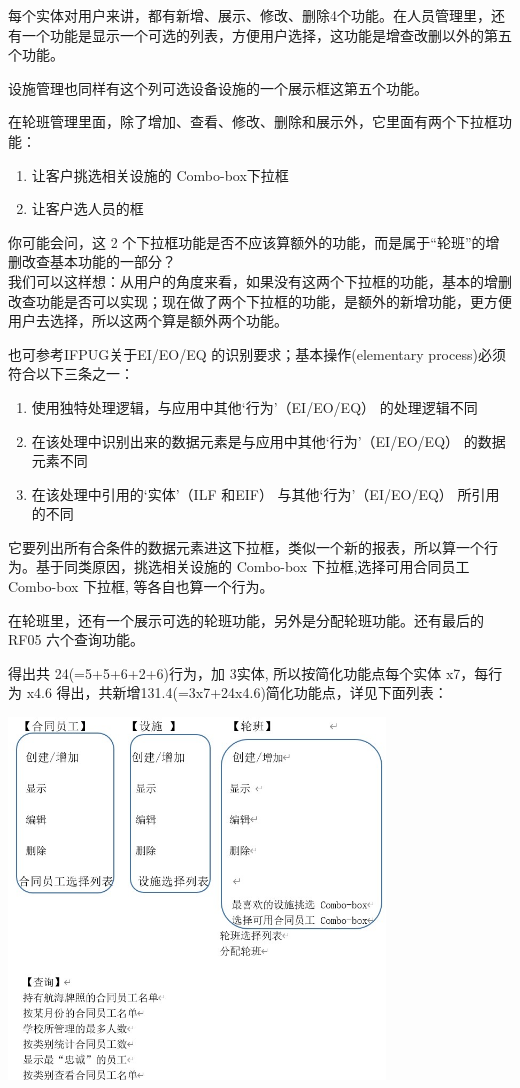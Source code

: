 每个实体对用户来讲，都有新增、展示、修改、删除4个功能。在人员管理里，还有一个功能是显示一个可选的列表，方便用户选择，这功能是增查改删以外的第五个功能。

设施管理也同样有这个列可选设备设施的一个展示框这第五个功能。

在轮班管理里面，除了增加、查看、修改、删除和展示外，它里面有两个下拉框功能：

\begin{enumerate}
\tightlist
\item
  让客户挑选相关设施的 Combo-box下拉框
\item
  让客户选人员的框
\end{enumerate}

你可能会问，这 2
个下拉框功能是否不应该算额外的功能，而是属于``轮班''的增删改查基本功能的一部分？\\
我们可以这样想：从用户的角度来看，如果没有这两个下拉框的功能，基本的增删改查功能是否可以实现；现在做了两个下拉框的功能，是额外的新增功能，更方便用户去选择，所以这两个算是额外两个功能。

也可参考IFPUG关于EI/EO/EQ 的识别要求；基本操作(elementary
process)必须符合以下三条之一：

\begin{enumerate}
\tightlist
\item
  使用独特处理逻辑，与应用中其他`行为'（EI/EO/EQ） 的处理逻辑不同
\item
  在该处理中识别出来的数据元素是与应用中其他`行为'（EI/EO/EQ）
  的数据元素不同
\item
  在该处理中引用的`实体'（ILF 和EIF） 与其他`行为'（EI/EO/EQ）
  所引用的不同
\end{enumerate}

它要列出所有合条件的数据元素进这下拉框，类似一个新的报表，所以算一个行为。基于同类原因，挑选相关设施的
Combo-box 下拉框,选择可用合同员工 Combo-box 下拉框, 等各自也算一个行为。

在轮班里，还有一个展示可选的轮班功能，另外是分配轮班功能。还有最后的
RF05 六个查询功能。

得出共 24(=5+5+6+2+6)行为，加 3实体, 所以按简化功能点每个实体 x7，每行为
x4.6 得出，共新增131.4(=3x7+24x4.6)简化功能点，详见下面列表：


\includegraphics[width=10cm]{Ex1SoluScreenshot20220405115926.jpg}

